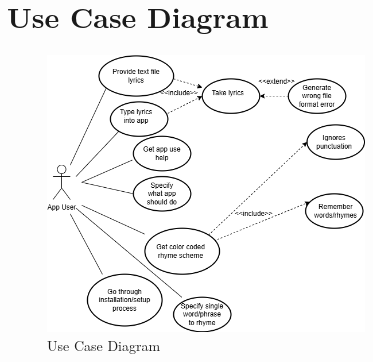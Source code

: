 \documentclass[12pt,a4paper]{report}
\begin{document}
\section{Use Case Diagram}
\begin{figure}[h]
    \centering
    \includegraphics[width=0.75\textwidth]{use-case-diagram.png}
    \caption{Use Case Diagram}
\end{figure}
\end{document}
